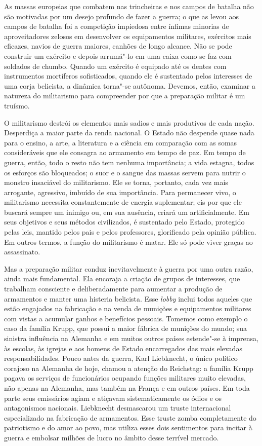 As massas europeias que combatem nas trincheiras e nos campos de batalha
não são motivadas por um desejo profundo de fazer a guerra; o que as
levou aos campos de batalha foi a competição impiedosa entre ínfimas
minorias de aproveitadores zelosos em desenvolver os equipamentos
militares, exércitos mais eficazes, navios de guerra maiores, canhões
de longo alcance. Não se pode construir um exército e depois arrumá"-lo
em uma caixa como se faz com soldados de chumbo. Quando um exército é
equipado até os dentes com instrumentos mortíferos sofisticados,
quando ele é sustentado pelos interesses de uma corja belicista, a 
dinâmica torna"-se autônoma. Devemos, então, examinar a natureza do
militarismo para compreender por que a preparação militar é um truísmo.

O militarismo destrói os elementos mais sadios e mais produtivos de cada
nação. Desperdiça a maior parte da renda nacional. O Estado não
despende quase nada para o ensino, a arte, a literatura e a ciência em
comparação com as somas consideráveis que ele consagra ao armamento em
tempo de paz. Em tempo de guerra, então, todo o resto não tem nenhuma
importância; a vida estagna, todos os esforços são bloqueados; o suor e
o sangue das massas servem para nutrir o monstro insaciável do
militarismo. Ele se torna, portanto, cada vez mais arrogante,
agressivo, imbuído de sua importância. Para permanecer vivo, o
militarismo necessita constantemente de energia suplementar; eis por
que ele buscará sempre um inimigo ou, em sua ausência, criará um
artificialmente. Em seus objetivos e seus métodos civilizados, é
sustentado pelo Estado, protegido pelas leis, mantido pelos pais e
pelos professores, glorificado pela opinião pública. Em outros
termos, a função do militarismo é matar. Ele só pode viver graças ao
assassinato.

Mas a preparação militar conduz inevitavelmente à guerra por uma outra
razão, ainda mais fundamental. Ela encoraja a criação de grupos de
interesses, que trabalham consciente e deliberadamente para aumentar a
produção de armamentos e manter uma histeria belicista. Esse \textit{lobby}
inclui todos aqueles que estão engajados na fabricação e na venda de
munições e equipamentos militares com vistas a acumular ganhos e
benefícios pessoais. Tomemos como exemplo o caso da família Krupp, que
possui a maior fábrica de munições do mundo; sua sinistra influência na
Alemanha e em muitos outros países estende"-se à imprensa, às escolas,
às igrejas e aos homens de Estado encarregados das mais elevadas
responsabilidades. Pouco antes da guerra, Karl Liebknecht, o único
político corajoso na Alemanha de hoje, chamou a atenção do Reichstag: a
família Krupp pagava os serviços de funcionários ocupando funções
militares muito elevadas, não apenas na Alemanha, mas também na França
e em outros países. Em toda parte seus emissários agiam e atiçavam
sistematicamente os ódios e os antagonismos nacionais. Liebknecht
desmascarou um truste internacional especializado na fabricação de
armamentos. Esse truste zomba completamente do patriotismo e do amor ao
povo, mas utiliza esses dois sentimentos para incitar à guerra e
embolsar milhões de lucro no âmbito desse terrível mercado.

